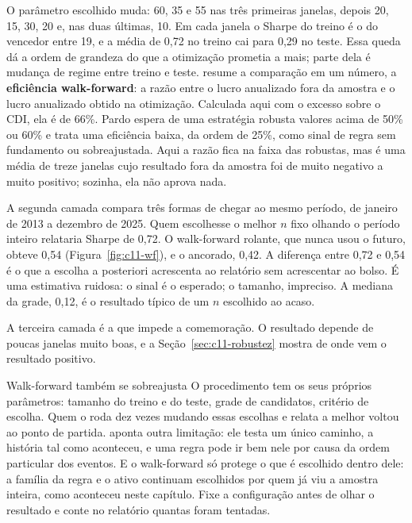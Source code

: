 O parâmetro escolhido muda: 60, 35 e 55 nas três primeiras janelas, depois 20, 15, 30, 20 e, nas duas últimas, 10. Em cada janela o Sharpe do treino é o do vencedor entre 19, e a média de 0,72 no treino cai para 0,29 no teste. Essa queda dá a ordem de grandeza do que a otimização prometia a mais; parte dela é mudança de regime entre treino e teste. \citet{pardo2008} resume a comparação em um número, a \textbf{eficiência walk-forward}: a razão entre o lucro anualizado fora da amostra e o lucro anualizado obtido na otimização. Calculada aqui com o excesso sobre o CDI, ela é de 66\%. Pardo espera de uma estratégia robusta valores acima de 50\% ou 60\% e trata uma eficiência baixa, da ordem de 25\%, como sinal de regra sem fundamento ou sobreajustada. Aqui a razão fica na faixa das robustas, mas é uma média de treze janelas cujo resultado fora da amostra foi de muito negativo a muito positivo; sozinha, ela não aprova nada.

A segunda camada compara três formas de chegar ao mesmo período, de janeiro de 2013 a dezembro de 2025. Quem escolhesse o melhor $n$ fixo olhando o período inteiro relataria Sharpe de 0,72. O walk-forward rolante, que nunca usou o futuro, obteve 0,54 (Figura~\ref{fig:c11-wf}), e o ancorado, 0,42. A diferença entre 0,72 e 0,54 é o que a escolha a posteriori acrescenta ao relatório sem acrescentar ao bolso. É uma estimativa ruidosa: o sinal é o esperado; o tamanho, impreciso. A mediana da grade, 0,12, é o resultado típico de um $n$ escolhido ao acaso.


A terceira camada é a que impede a comemoração. O resultado depende de poucas janelas muito boas, e a Seção~\ref{sec:c11-robustez} mostra de onde vem o resultado positivo.

\begin{armadilha}{Walk-forward também se sobreajusta}
O procedimento tem os seus próprios parâmetros: tamanho do treino e do teste, grade de candidatos, critério de escolha. Quem o roda dez vezes mudando essas escolhas e relata a melhor voltou ao ponto de partida. \citet{lopezdeprado2018} aponta outra limitação: ele testa um único caminho, a história tal como aconteceu, e uma regra pode ir bem nele por causa da ordem particular dos eventos. E o walk-forward só protege o que é escolhido dentro dele: a família da regra e o ativo continuam escolhidos por quem já viu a amostra inteira, como aconteceu neste capítulo. Fixe a configuração antes de olhar o resultado e conte no relatório quantas foram tentadas.
\end{armadilha}

